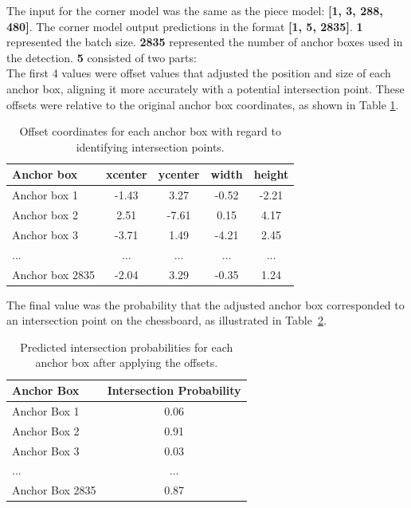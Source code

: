 The input for the corner model was the same as the piece model: \textbf{[1, 3, 288, 480]}. The corner model output predictions in the format \textbf{[1, 5, 2835]}. \textbf{1} represented the batch size. \textbf{2835} represented the number of anchor boxes used in the detection. \textbf{5} consisted of two parts: \\

The first 4 values were offset values that adjusted the position and size of each anchor box, aligning it more accurately with a potential intersection point. These offsets were relative to the original anchor box coordinates, as shown in Table \ref{tab:corner-offset-table}.

\newpage

\begin{table}[h]
    \centering
    \caption{Offset coordinates for each anchor box with regard to identifying intersection points.}  %
    \renewcommand{\arraystretch}{1.5} %
    \begin{tabular}{lcccc}
        \toprule
        \textbf{Anchor box} & \textbf{xcenter} & \textbf{ycenter} & \textbf{width} & \textbf{height} \\
        \midrule
        Anchor box 1 & -1.43 & 3.27 & -0.52 & -2.21 \\
        Anchor box 2 & 2.51 & -7.61 & 0.15 & 4.17 \\
        Anchor box 3 & -3.71 & 1.49 & -4.21 & 2.45 \\
        ... & ... & ... & ... & ... \\
        Anchor box 2835 & -2.04 & 3.29 & -0.35 & 1.24 \\
        \bottomrule
    \end{tabular}
    \label{tab:corner-offset-table}
\end{table}

The final value was the probability that the adjusted anchor box corresponded to an intersection point on the chessboard, as illustrated in Table~\ref{tab:corner-probability-table}. \\

\begin{table}[h]
    \centering
    \caption{Predicted intersection probabilities for each anchor box after applying the offsets.}
    \renewcommand{\arraystretch}{1.5}
    \begin{tabular}{lc}
        \toprule
        \textbf{Anchor Box} & \textbf{Intersection Probability} \\
        \midrule
        Anchor Box 1 & 0.06 \\
        Anchor Box 2 & 0.91 \\
        Anchor Box 3 & 0.03 \\
        ... & ... \\
        Anchor Box 2835 & 0.87 \\
        \bottomrule
    \end{tabular}
    \label{tab:corner-probability-table}
\end{table}


